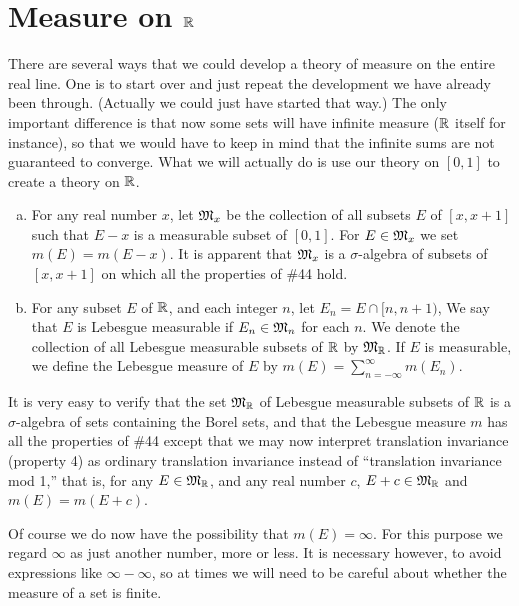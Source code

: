 \chapter{Measure on $\mathbb{R}$}

\begin{rmk}%
	There are several ways that we could develop a theory of measure on the 
	entire real line. One is to start over and just repeat the development we 
	have already been through. (Actually we could just have started that way.) 
	The only important difference is that now some sets will have infinite 
	measure ($\mathbb{R}$ itself for instance), so that we would have to keep in mind 
	that the infinite sums are not guaranteed to converge. What we will 
	actually do is use our theory on $[0,1]$ to create a theory on $\mathbb{R}$. 
\end{rmk}

\begin{defn}\label{d:measurableset}%
	\begin{enumerate}[(a)] 
	\item For any real number $x$, let $\mathfrak{M}_x$ be the collection of all subsets 
	$E$ of $[x,x+1]$ such that $E-x$ is a measurable subset of $[0,1]$. For 
	$E \in \mathfrak{M}_x$ we set $m(E) = m(E - x)$. It is apparent that $\mathfrak{M}_x$ is a 
	$\sigma$-algebra of subsets of $[x,x+1]$ on which all the properties of 
	\#44 hold. 
	\item For any subset $E$ of $\mathbb{R}$, and each integer $n$, let $E_n = 
	E \cap [n,n+1)$, We say that $E$ is Lebesgue measurable if $E_n \in \mathfrak{M}_n$ 
	for each $n$. We denote the collection of all Lebesgue measurable subsets 
	of $\mathbb{R}$ by $\mathfrak{M}_{\mathbb{R}}$. If $E$ is measurable, we define the Lebesgue measure 
	of $E$ by $m(E) = \sum\limits_{n=-\infty}^\infty m(E_n)$.  
	\end{enumerate}
\end{defn}

\begin{rmk}%
	It is very easy to verify that the set $\mathfrak{M}_{\mathbb{R}}$ of Lebesgue measurable 
	subsets of $\mathbb{R}$ is a $\sigma$-algebra of sets containing the Borel sets, 
	and that the Lebesgue measure $m$ has all the properties of \#44 except 
	that we may now interpret translation invariance (property 4) as ordinary 
	translation invariance instead of ``translation invariance mod 1,'' that 
	is, for any $E \in \mathfrak{M}_{\mathbb{R}}$, and any real number $c$, $E + c \in \mathfrak{M}_{\mathbb{R}}$ and 
	$m(E) = m(E+c)$. 

	Of course we do now have the possibility that $m(E) = \infty$. For this 
	purpose we regard $\infty$ as just another number, more or less. It is 
	necessary however, to avoid expressions like $\infty - \infty$, so at times 
	we will need to be careful about whether the measure of a set is finite. 
\end{rmk}

